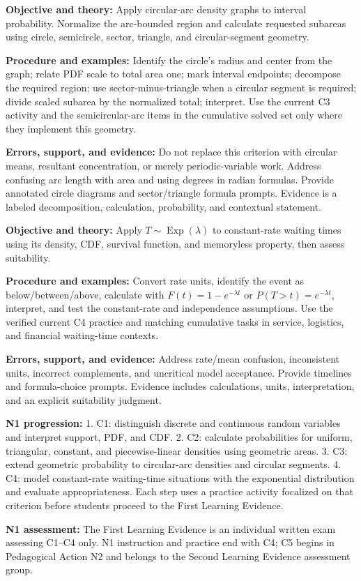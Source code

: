 \documentclass[10pt,letterpaper]{article}
\newcommand{\labelled}[2]{\textbf{#1:} #2\par}
\newcommand{\criterionpart}[1]{\Needspace{10\baselineskip}\par\vspace{4pt}{\bfseries #1\par}}
\begin{document}
	\criterionpart{C3 -- Circular-arc PDFs and circular segments}
	\labelled{Objective and theory}{Apply circular-arc density graphs to interval probability. Normalize the arc-bounded region and calculate requested subareas using circle, semicircle, sector, triangle, and circular-segment geometry.}
	\labelled{Procedure and examples}{Identify the circle's radius and center from the graph; relate PDF scale to total area one; mark interval endpoints; decompose the required region; use sector-minus-triangle when a circular segment is required; divide scaled subarea by the normalized total; interpret. Use the current C3 activity and the semicircular-arc items in the cumulative solved set only where they implement this geometry.}
	\labelled{Errors, support, and evidence}{Do not replace this criterion with circular means, resultant concentration, or merely periodic-variable work. Address confusing arc length with area and using degrees in radian formulas. Provide annotated circle diagrams and sector/triangle formula prompts. Evidence is a labeled decomposition, calculation, probability, and contextual statement.}
	
	\criterionpart{C4 -- Exponential waiting-time models}
	\labelled{Objective and theory}{Apply $T\sim\operatorname{Exp}(\lambda)$ to constant-rate waiting times using its density, CDF, survival function, and memoryless property, then assess suitability.}
	\labelled{Procedure and examples}{Convert rate units, identify the event as below/between/above, calculate with $F(t)=1-e^{-\lambda t}$ or $P(T>t)=e^{-\lambda t}$, interpret, and test the constant-rate and independence assumptions. Use the verified current C4 practice and matching cumulative tasks in service, logistics, and financial waiting-time contexts.}
	\labelled{Errors, support, and evidence}{Address rate/mean confusion, inconsistent units, incorrect complements, and uncritical model acceptance. Provide timelines and formula-choice prompts. Evidence includes calculations, units, interpretation, and an explicit suitability judgment.}
	
	\labelled{N1 progression}{1. C1: distinguish discrete and continuous random variables and interpret support, PDF, and CDF. 2. C2: calculate probabilities for uniform, triangular, constant, and piecewise-linear densities using geometric areas. 3. C3: extend geometric probability to circular-arc densities and circular segments. 4. C4: model constant-rate waiting-time situations with the exponential distribution and evaluate appropriateness. Each step uses a practice activity focalized on that criterion before students proceed to the First Learning Evidence.}
	\labelled{N1 assessment}{The First Learning Evidence is an individual written exam assessing C1--C4 only. N1 instruction and practice end with C4; C5 begins in Pedagogical Action N2 and belongs to the Second Learning Evidence assessment group.}
	
\end{document}
